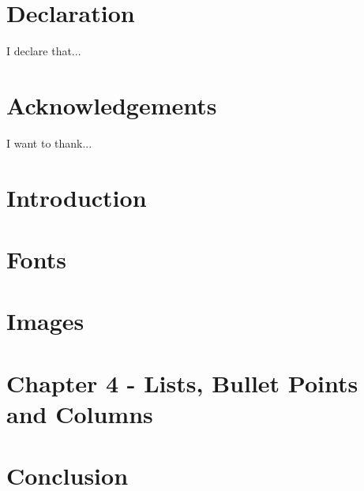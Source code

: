 \chapter*{Declaration}
I declare that...

 
\chapter*{Acknowledgements}
I want to thank...


\mainmatter %

\chapter{Introduction}
 
\chapter{Fonts}
 
\chapter{Images}
 
\chapter{Chapter 4 - Lists, Bullet Points and Columns}
 
\chapter{Conclusion}

